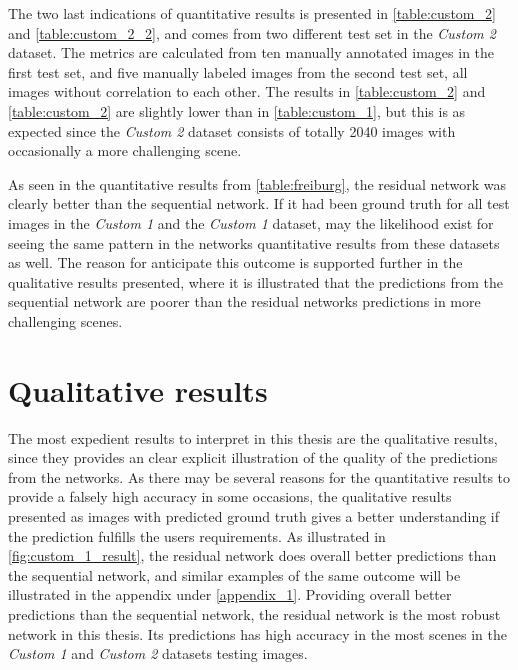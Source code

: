 \documentclass[USenglish]{ifimaster}  %
\begin{document}
The two last indications of quantitative results is presented in \cref{table:custom_2} and \cref{table:custom_2_2}, and comes from two different test set in the \textit{Custom 2} dataset. The metrics are calculated from ten manually annotated images in the first test set, and five manually labeled images from the second test set, all images without correlation to each other. The results in \cref{table:custom_2} and \cref{table:custom_2} are slightly lower than in \cref{table:custom_1}, but this is as expected since the \textit{Custom 2} dataset consists of totally 2040 images with occasionally a more challenging scene. 

As seen in the quantitative results from \cref{table:freiburg}, the residual network was clearly better than the sequential network. If it had been ground truth for all test images in the \textit{Custom 1} and the \textit{Custom 1} dataset, may the likelihood exist for seeing the same pattern in the networks quantitative results from these datasets as well. The reason for anticipate this outcome is supported further in the qualitative results presented, where it is illustrated that the predictions from the sequential network are poorer than the residual networks predictions in more challenging scenes. 

\section{Qualitative results}
The most expedient results to interpret in this thesis are the qualitative results, since they provides an clear explicit illustration of the quality of the predictions from the networks. As there may be several reasons for the quantitative results to provide a falsely high accuracy in some occasions, the qualitative results presented as images with predicted ground truth gives a better understanding if the prediction fulfills the users requirements. As illustrated in \cref{fig:custom_1_result}, the residual network does overall better predictions than the sequential network, and similar examples of the same outcome will be illustrated in the appendix under \cref{appendix_1}. Providing overall better predictions than the sequential network, the residual network is the most robust network in this thesis. Its predictions has high accuracy in the most scenes in the \textit{Custom 1} and \textit{Custom 2} datasets testing images.        
\end{document}
